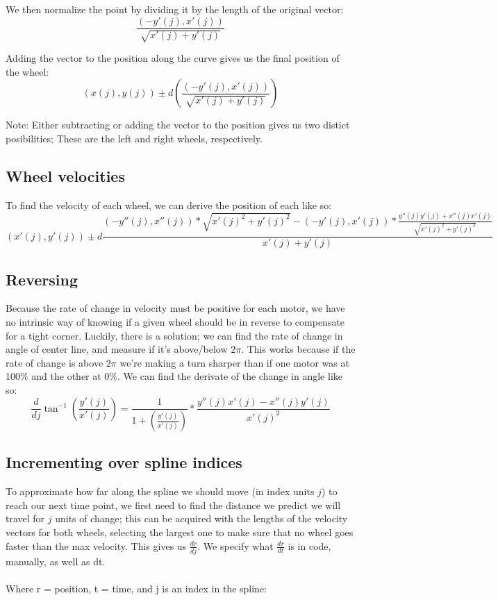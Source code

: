 \documentclass[12pt, english]{article}
\begin{document}
\noindent
We then normalize the point by dividing it by the length of the original vector: \\
\begin{equation}
	\label{deriv_speed_vec}
	\frac{(-y'(j), x'(j))}{\sqrt{x'(j)+y'(j)}}
\end{equation}

\noindent
Adding the vector to the position along the curve gives us the final position of the wheel:
\begin{equation}
	(x(j), y(j)) \pm d \left(\frac{(-y'(j), x'(j))}{\sqrt{x'(j)+y'(j)}}\right)
\end{equation}

\noindent
Note: Either subtracting or adding the vector to the position gives us two distict posibilities; These are the left and right wheels, respectively.

\subsection{Wheel velocities}
To find the velocity of each wheel, we can derive the position of each like so:
\begin{equation}
	(x'(j), y'(j)) \pm d\frac{(-y''(j), x''(j))*\sqrt{x'(j)^2+y'(j)^2} - (-y'(j), x'(j)) * \frac{y''(j)y'(j) + x''(j)x'(j)}{\sqrt{x'(j)^2+y'(j)^2}}}{x'(j)+y'(j)}
\end{equation}

\subsection{Reversing}
Because the rate of change in velocity must be positive for each motor, we have no intrinsic way of knowing if a given wheel should be in reverse to compensate for a tight corner. Luckily, there is a solution; we can find the rate of change in angle of center line, and measure if it's above/below $2\pi$. This works because if the rate of change is above $2\pi$ we're making a turn sharper than if one motor was at 100\% and the other at 0\%. We can find the derivate of the change in angle like so:
\begin{equation}
	\label{change_in_angle}
	\frac{d}{dj} 
	\tan^{-1}{\left(\frac{y'(j)}{x'(j)}\right)} = 
	\frac{1}{1 + \left(\frac{y'(j)}{x'(j)}\right)} * \frac{y''(j)x'(j) - x''(j)y'(j)}{x'(j)^2}
\end{equation}


\subsection{Incrementing over spline indices}
To approximate how far along the spline we should move (in index units $j$) to reach our next time point, we first need to find the distance we predict we will travel for $j$ units of change; this can be acquired with the lengths of the velocity vectors for both wheels, selecting the largest one to make sure that no wheel goes faster than the max velocity. This gives us $\frac{dr}{dj}$. We specify what $\frac{dr}{dt}$ is in code, manually, as well as dt. \\
\\
\noindent
Where r = position, t = time, and j is an index in the spline:
\end{document}
